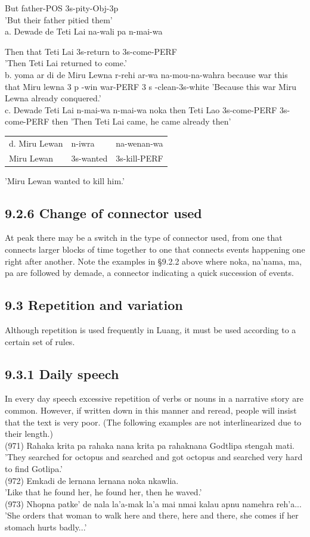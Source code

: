 \documentclass[10pt]{article}
\begin{document}
But father-POS 3s-pity-Obj-3p\\
'But their father pitied them'\\
a. Dewade de Teti Lai na-wali pa n-mai-wa

Then that Teti Lai 3s-return to 3s-come-PERF\\
'Then Teti Lai returned to come.'\\
b. yoma ar di de Miru Lewna r-rehi ar-wa na-mou-na-wahra because war this that Miru lewna 3 p -win war-PERF 3 s -clean-3s-white 'Because this war Miru Lewna already conquered.'\\
c. Dewade Teti Lai n-mai-wa n-mai-wa noka then Teti Lao 3s-come-PERF 3s-come-PERF then 'Then Teti Lai came, he came already then'

\begin{center}
\begin{tabular}{lll}
d. Miru Lewan & n-iwra & na-wenan-wa \\
Miru Lewan & 3s-wanted & 3s-kill-PERF \\
\end{tabular}
\end{center}

'Miru Lewan wanted to kill him.'

\subsection*{9.2.6 Change of connector used}
At peak there may be a switch in the type of connector used, from one that connects larger blocks of time together to one that connects events happening one right after another. Note the examples in §9.2.2 above where noka, na'nama, ma, pa are followed by demade, a connector indicating a quick succession of events.

\subsection*{9.3 Repetition and variation}
Although repetition is used frequently in Luang, it must be used according to a certain set of rules.

\subsection*{9.3.1 Daily speech}
In every day speech excessive repetition of verbs or nouns in a narrative story are common. However, if written down in this manner and reread, people will insist that the text is very poor. (The following examples are not interlinearized due to their length.)\\
(971) Rahaka krita pa rahaka nana krita pa rahaknana Godtlipa stengah mati.\\
'They searched for octopus and searched and got octopus and searched very hard to find Gotlipa.'\\
(972) Emkadi de lernana lernana noka nkawlia.\\
'Like that he found her, he found her, then he waved.'\\
(973) Nhopna patke' de nala la'a-mak la'a mai nmai kalau apnu namehra reh'a...\\
'She orders that woman to walk here and there, here and there, she comes if her stomach hurts badly...'
\end{document}
